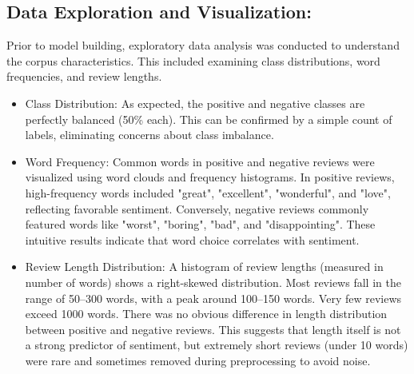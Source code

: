 \documentclass{article}
\begin{document}
\subsection{Data Exploration and Visualization:}
Prior to model building, exploratory data analysis was conducted to understand the corpus characteristics. This included examining class distributions, word frequencies, and review lengths.
\begin{itemize}
\item Class Distribution: As expected, the positive and negative classes are perfectly balanced (50\% each). This can be confirmed by a simple count of labels, eliminating concerns about class imbalance.
\item Word Frequency: Common words in positive and negative reviews were visualized using word clouds and frequency histograms. In positive reviews, high-frequency words included "great", "excellent", "wonderful", and "love", reflecting favorable sentiment. Conversely, negative reviews commonly featured words like "worst", "boring", "bad", and "disappointing". These intuitive results indicate that word choice correlates with sentiment.
\item Review Length Distribution: A histogram of review lengths (measured in number of words) shows a right-skewed distribution. Most reviews fall in the range of 50–300 words, with a peak around 100–150 words. Very few reviews exceed 1000 words. There was no obvious difference in length distribution between positive and negative reviews. This suggests that length itself is not a strong predictor of sentiment, but extremely short reviews (under 10 words) were rare and sometimes removed during preprocessing to avoid noise.
\end{itemize}
\end{document}
